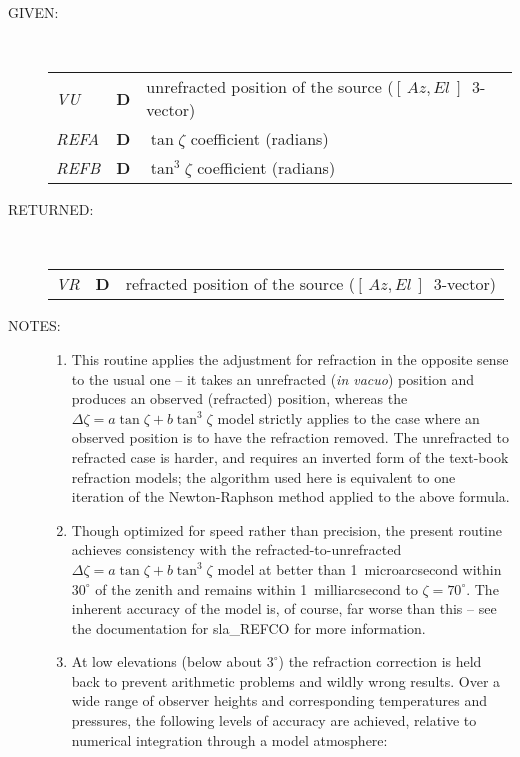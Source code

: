 \documentclass[11pt,twoside]{article}
\newcommand{\azel}      {$[\,Az,El~]$}
\newlength{\oldspacing}
\newcommand{\args}[2]
{
  \goodbreak
  \setlength{\oldspacing}{\topsep}
  \setlength{\topsep}{0.3ex}
  \begin{description}
  \item[#1]:\\[1.5ex]
    \begin{tabular}{p{7em}p{6em}p{22em}}
      #2
    \end{tabular}
  \end{description}
  \setlength{\topsep}{\oldspacing}
}
\renewcommand{\args}[2]
   {
     \begin{description}
        \item[#1:]\\
        \begin{tabular}{p{7em}p{6em}l}
           #2
        \end{tabular}
     \end{description}
   }
\newcommand{\spec}[3]
{
  {\em {#1}} & {\bf \mbox{#2}} & {#3}
}
\newcommand{\notes}[1]
{
  \goodbreak
  \setlength{\oldspacing}{\topsep}
  \setlength{\topsep}{0.3ex}
  \begin{description}
    \item[NOTES]:
        #1
  \end{description}
  \setlength{\topsep}{\oldspacing}
}
\renewcommand{\notes}[1]
   {
      \begin{description}
         \item[NOTES:]
            #1
      \end{description}
   }
\begin{document}
\args{GIVEN}
{
 \spec{VU}{D}{unrefracted position of the source (\azel\ 3-vector)} \\
 \spec{REFA}{D}{$\tan \zeta$ coefficient (radians)} \\
 \spec{REFB}{D}{$\tan^{3} \zeta$ coefficient (radians)}
}
\args{RETURNED}
{
 \spec{VR}{D}{refracted position of the source (\azel\ 3-vector)}
}
\notes
{
 \begin{enumerate}
  \item This routine applies the adjustment for refraction in the
        opposite sense to the usual one -- it takes an unrefracted
        ({\it in vacuo}\/) position and produces an observed (refracted)
        position, whereas the
        $\Delta \zeta = a \tan \zeta + b \tan^{3} \zeta$
        model strictly
        applies to the case where an observed position is to have the
        refraction removed.  The unrefracted to refracted case is
        harder, and requires an inverted form of the text-book
        refraction models;  the algorithm used here is equivalent to
        one iteration of the Newton-Raphson method applied to the
        above formula.
  \item Though optimized for speed rather than precision, the present
        routine achieves consistency with the refracted-to-unrefracted
        $\Delta \zeta = a \tan \zeta + b \tan^{3} \zeta$
        model at better than 1~microarcsecond within
        $30^\circ$ of the zenith and remains within 1~milliarcsecond to
        $\zeta=70^\circ$.  The inherent accuracy of the model is, of
        course, far worse than this -- see the documentation for sla\_REFCO
        for more information.
  \item At low elevations (below about $3^\circ$) the refraction
        correction is held back to prevent arithmetic problems and
        wildly wrong results.  Over a wide range of observer heights
        and corresponding temperatures and pressures, the following
        levels of accuracy are achieved, relative to numerical
        integration through a model atmosphere:


\end{enumerate}}
\end{document}
